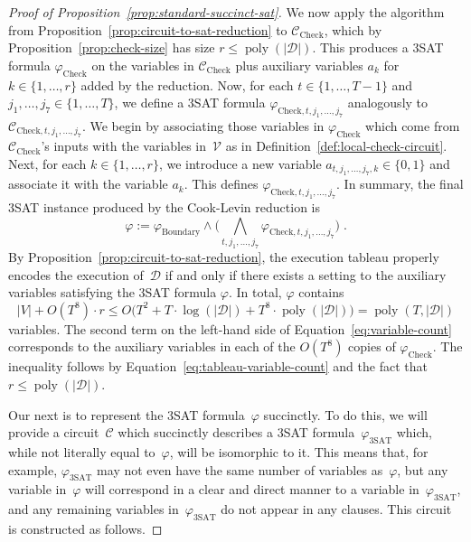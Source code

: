 \documentclass[11pt]{article}
\theoremstyle{definition}
\DeclareMathOperator{\poly}{poly}
\newcommand{\decider}{\mathcal{D}}
\newcommand{\circuit}{\mathcal{C}}
\begin{document}
\begin{proof}[Proof of Proposition~\ref{prop:standard-succinct-sat}]
We now apply the algorithm from Proposition~\ref{prop:circuit-to-sat-reduction}
to $\circuit_{\mathrm{Check}}$, which by Proposition~\ref{prop:check-size} has
size $r \leq \poly(|\decider|)$.
This produces a 3SAT formula $\varphi_{\mathrm{Check}}$ on the variables in
$\circuit_{\mathrm{Check}}$ plus auxiliary variables $a_k$ for $k \in \{1,
\ldots, r\}$ added by the reduction.
Now, for each $t \in \{1, \ldots, T-1\}$ and $j_1, \ldots, j_7 \in \{1, \ldots,
T\}$, we define a 3SAT formula $\varphi_{\mathrm{Check}, t, j_1, \ldots, j_7}$
analogously to $\circuit_{\mathrm{Check}, t, j_1, \ldots, j_7}$.
We begin by associating those variables in $\varphi_{\mathrm{Check}}$ which come
from $\circuit_{\mathrm{Check}}$'s inputs with the variables in~$\mathcal{V}$ as
in Definition~\ref{def:local-check-circuit}.
Next, for each $k \in \{1, \ldots, r\}$, we introduce a new variable $a_{t, j_1,
  \ldots, j_7, k} \in \{0, 1\}$ and associate it with the variable $a_k$.
This defines $\varphi_{\mathrm{Check}, t, j_1, \ldots, j_7}$.
In summary, the final 3SAT instance produced by the Cook-Levin reduction is
\begin{equation}\label{eq:cook-levin-3sat}
  \varphi:= \varphi_{\mathrm{Boundary}} \land \big(\bigwedge_{t, j_1, \ldots, j_7}
  \varphi_{\mathrm{Check}, t, j_1, \ldots, j_7}\big)\;.
\end{equation}
By Proposition~\ref{prop:circuit-to-sat-reduction}, the execution tableau
properly encodes the execution of~$\decider$ if and only if there exists a
setting to the auxiliary variables satisfying the 3SAT formula $\varphi$.
In total, $\varphi$ contains
\begin{equation}\label{eq:variable-count}
|V| + O(T^8) \cdot r
\leq O\big(T^2 + T \cdot \log(|\decider|)
    + T^8\cdot \poly(|\decider|)\big)
 = \poly(T, |\decider|)
\end{equation}
variables.
The second term on the left-hand side of Equation~\eqref{eq:variable-count}
corresponds to the auxiliary variables in each of the $O(T^8)$ copies of
$\varphi_{\mathrm{Check}}$.
The inequality follows by Equation~\eqref{eq:tableau-variable-count} and the
fact that $r \leq \poly(|\decider|)$.
  
Our next is to represent the 3SAT formula~$\varphi$ succinctly.
To do this, we will provide a circuit~$\circuit$ which succinctly describes a
3SAT formula~$\varphi_{\mathrm{3SAT}}$ which, while not literally equal
to~$\varphi$, will be isomorphic to it.
This means that, for example, $\varphi_{\mathrm{3SAT}}$ may not even have the
same number of variables as~$\varphi$, but any variable in~$\varphi$ will
correspond in a clear and direct manner to a variable
in~$\varphi_{\mathrm{3SAT}}$, and any remaining variables
in~$\varphi_{\mathrm{3SAT}}$ do not appear in any clauses.
This circuit is constructed as follows.


\end{proof}
\end{document}
